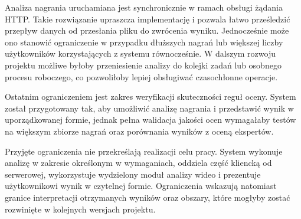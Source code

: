 Analiza nagrania uruchamiana jest synchronicznie w ramach obsługi żądania HTTP. Takie rozwiązanie upraszcza implementację i pozwala łatwo prześledzić przepływ danych od przesłania pliku do zwrócenia wyniku. Jednocześnie może ono stanowić ograniczenie w przypadku dłuższych nagrań lub większej liczby użytkowników korzystających z systemu równocześnie. W dalszym rozwoju projektu możliwe byłoby przeniesienie analizy do kolejki zadań lub osobnego procesu roboczego, co pozwoliłoby lepiej obsługiwać czasochłonne operacje.

Ostatnim ograniczeniem jest zakres weryfikacji skuteczności reguł oceny. System został przygotowany tak, aby umożliwić analizę nagrania i przedstawić wynik w uporządkowanej formie, jednak pełna walidacja jakości ocen wymagałaby testów na większym zbiorze nagrań oraz porównania wyników z oceną ekspertów.

Przyjęte ograniczenia nie przekreślają realizacji celu pracy. System wykonuje analizę w zakresie określonym w wymaganiach, oddziela część kliencką od serwerowej, wykorzystuje wydzielony moduł analizy wideo i prezentuje użytkownikowi wynik w czytelnej formie. Ograniczenia wskazują natomiast granice interpretacji otrzymanych wyników oraz obszary, które mogłyby zostać rozwinięte w kolejnych wersjach projektu.
